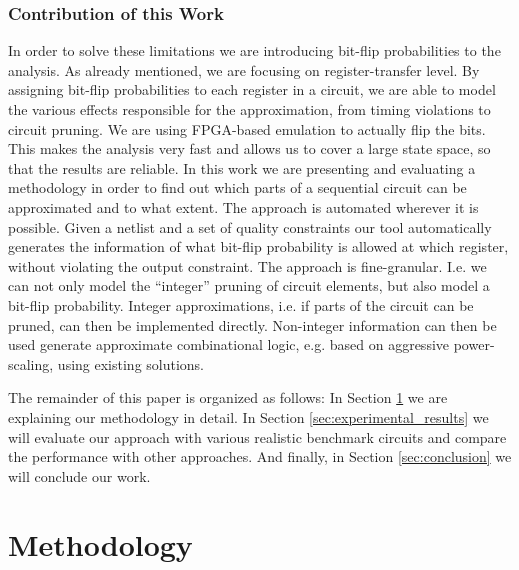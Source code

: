 \documentclass[conference]{IEEEtran}
\begin{document}
\subsubsection*{Contribution of this Work}
In order to solve these limitations we are introducing bit-flip probabilities to the analysis. As already mentioned, we are focusing on register-transfer level. By assigning bit-flip probabilities to each register in a circuit, we are able to model the various effects responsible for the approximation, from timing violations to circuit pruning. We are using FPGA-based emulation to actually flip the bits. This makes the analysis very fast and allows us to cover a large state space, so that the results are reliable. In this work we are presenting and evaluating a methodology in order to find out which parts of a sequential circuit can be approximated and to what extent. The approach is automated wherever it is possible. Given a netlist and a set of quality constraints our tool automatically generates the information of what bit-flip probability is allowed at which register, without violating the output constraint. The approach is fine-granular. I.e. we can not only model the ``integer'' pruning of circuit elements, but also model a bit-flip probability. Integer approximations, i.e. if parts of the circuit can be pruned, can then be implemented directly. Non-integer information can then be used generate approximate combinational logic, e.g. based on aggressive power-scaling, using existing solutions.

The remainder of this paper is organized as follows: In Section \ref{sec:methodology} we are explaining our methodology in detail. In Section \ref{sec:experimental_results} we will evaluate our approach with various realistic benchmark circuits and compare the performance with other approaches. And finally, in Section \ref{sec:conclusion} we will conclude our work.





\section{Methodology}
\label{sec:methodology}
\end{document}
